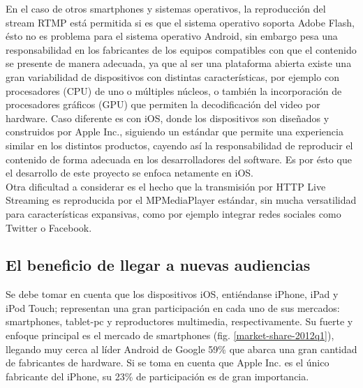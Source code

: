 	En el caso de otros smartphones y sistemas operativos, la reproducción del stream RTMP está permitida si es que el sistema operativo soporta Adobe Flash, ésto no es problema para el sistema operativo Android, sin embargo pesa una responsabilidad en los fabricantes de los equipos compatibles con que el contenido se presente de manera adecuada, ya que  al ser una plataforma abierta existe una gran variabilidad de dispositivos con distintas características, por ejemplo con procesadores (CPU) de uno o múltiples núcleos, o también la incorporación de procesadores gráficos (GPU) que permiten la decodificación del video por hardware. Caso diferente es con iOS, donde los dispositivos son diseñados y construidos por Apple Inc., siguiendo un estándar que permite una experiencia similar en los distintos productos, cayendo así la responsabilidad de reproducir el contenido de forma adecuada en los desarrolladores del software. Es por ésto que el desarrollo de este proyecto se enfoca netamente en iOS.\\

	Otra dificultad a considerar es el hecho que la transmisión por HTTP Live Streaming es reproducida por el MPMediaPlayer estándar, sin mucha versatilidad para características expansivas, como por ejemplo integrar redes sociales como Twitter o Facebook.\\

%
\subsection{El beneficio de llegar a nuevas audiencias}
Se debe tomar en cuenta que los dispositivos iOS, entiéndanse iPhone, iPad y iPod Touch; representan una gran participación en cada uno de sus mercados: smartphones, tablet-pc y reproductores  multimedia, respectivamente. Su fuerte y enfoque principal es el mercado de smartphones (fig. \ref{market-share-2012q1}), llegando muy cerca al líder Android de Google 59\% que abarca una gran cantidad de fabricantes de hardware. Si se toma en cuenta que Apple Inc. es el único fabricante del iPhone, su 23\% de participación es de gran importancia.\\

